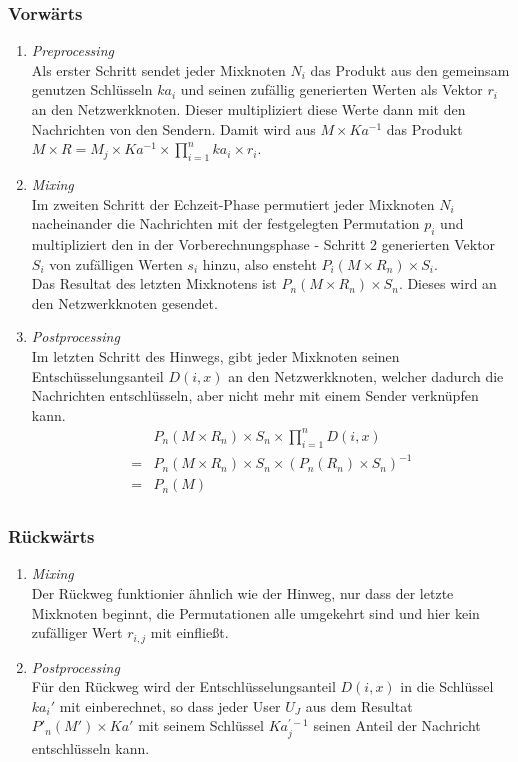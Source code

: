 \documentclass[
    fontsize=12pt,
    headings=small,
    parskip=half,           %
    bibliography=totoc,
    numbers=noenddot,       %
    open=any,               %
    ]{scrreprt}
\begin{document}
\subsubsection{Vorwärts}
\begin{enumerate}
	\item \textit{Preprocessing} \\
	Als erster Schritt sendet jeder Mixknoten $N_i$ das Produkt aus den gemeinsam genutzen Schlüsseln $ka_i$ und seinen zufällig generierten Werten als Vektor $r_i$ an den Netzwerkknoten.
Dieser multipliziert diese Werte dann mit den Nachrichten von den Sendern.
Damit wird aus $M \times Ka^{-1}$ das Produkt \(M \times R = M_j \times Ka^{-1} \times \prod_{i=1}^{n} ka_{i} \times r_i \).
	
	\item \textit{Mixing} \\
	Im zweiten Schritt der Echzeit-Phase permutiert jeder Mixknoten $N_i$ nacheinander die Nachrichten mit der festgelegten Permutation $p_i$ und multipliziert den in der Vorberechnungsphase - Schritt 2 generierten Vektor $S_i$ von zufälligen Werten $s_i$ hinzu, also ensteht
	\(P_i (M \times R_n) \times S_i\).\\
Das Resultat des letzten Mixknotens ist \(P_n(M \times R_n) \times S_n\).
Dieses wird an den Netzwerkknoten gesendet.

	
	\item \textit{Postprocessing} \\
Im letzten Schritt des Hinwegs, gibt jeder Mixknoten seinen Entschüsselungsanteil $D(i,x)$ an den Netzwerkknoten, welcher dadurch die Nachrichten entschlüsseln, aber nicht mehr mit einem Sender verknüpfen kann.
\begin{eqnarray*}
&P_n (M \times R_n) \times S_n \times \prod_{i=1}^n D(i,x)  \\
=& P_n(M \times R_n) \times S_n \times  (P_n(R_n) \times S_n)^{-1}  \\
=& P_n(M)  \\
\end{eqnarray*}
\end{enumerate}
\subsubsection{Rückwärts}
\begin{enumerate}
	\item \textit{Mixing} \\
	Der Rückweg funktionier ähnlich wie der Hinweg, nur dass der letzte Mixknoten beginnt, die Permutationen alle umgekehrt sind und hier kein zufälliger Wert
	$r_{i,j}$ mit einfließt.
	
	
	\item \textit{Postprocessing} \\
	Für den Rückweg wird der Entschlüsselungsanteil  \(D(i,x)\)
	 in die Schlüssel \(ka_i'\) mit einberechnet, so dass jeder User \(U_J\) aus dem Resultat \(P'_n(M') \times Ka' \) mit seinem Schlüssel \(Ka_j^{'-1}\) seinen Anteil der Nachricht entschlüsseln kann.



\end{enumerate}
\end{document}
